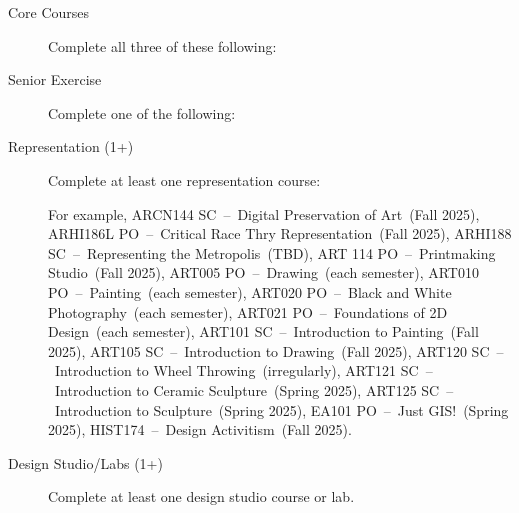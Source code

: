 \documentclass{article}\usepackage[]{graphicx}\usepackage[]{xcolor}
\newenvironment{itemize*}%
  {\begin{itemize}%
    \setlength{\itemsep}{0pt}%
    \setlength{\parskip}{0pt}}%
  {\end{itemize}}
\begin{document}
\begin{description}

  \item[Core Courses] Complete all three of these following:
  

  \item[Senior Exercise] Complete one of the following:
  


\item[Representation (1+)] Complete at least one representation course: 


For example, ARCN144 SC~--~Digital Preservation of Art~(Fall 2025), ARHI186L PO~--~Critical Race Thry Representation~(Fall 2025), ARHI188 SC~--~Representing the Metropolis~(TBD), ART 114 PO~--~Printmaking Studio~(Fall 2025), ART005 PO~--~Drawing~(each semester), ART010 PO~--~Painting~(each semester), ART020 PO~--~Black and White Photography~(each semester), ART021 PO~--~Foundations of 2D Design~(each semester), ART101 SC~--~Introduction to Painting~(Fall  2025), ART105 SC~--~Introduction to Drawing~(Fall 2025), ART120 SC~--~Introduction to Wheel Throwing~(irregularly), ART121 SC~--~Introduction to Ceramic Sculpture~(Spring 2025), ART125 SC~--~Introduction to Sculpture~(Spring 2025), EA101 PO~--~Just GIS!~(Spring 2025), HIST174~--~Design Activitism~(Fall 2025).




\item[Design Studio/Labs (1+)] Complete at least one design studio course or lab. 


\end{description}
\end{document}
